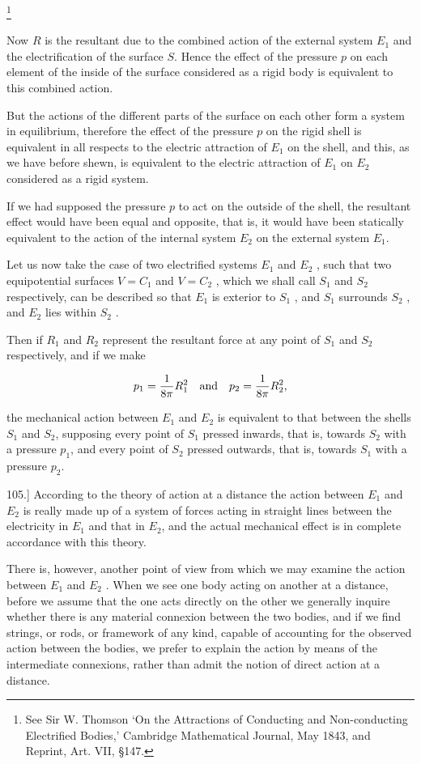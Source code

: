 \documentclass[11pt,a4paper]{article}
\begin{document}
\footnote[1]{See Sir W. Thomson `On the Attractions of Conducting and Non-conducting Electrified Bodies,' Cambridge Mathematical Journal, May 1843, and Reprint, Art. VII, \S 147.}

Now $R$ is the resultant due to the combined action of the external system $E_1$ and the electrification of the surface $S$. Hence the effect of the pressure $p$ on each element of the inside of the surface considered as a rigid body is equivalent to this combined action.

But the actions of the different parts of the surface on each other form a system in equilibrium, therefore the effect of the pressure $p$ on the rigid shell is equivalent in all respects to the electric attraction of $E_1$ on the shell, and this, as we have before shewn, is equivalent to the electric attraction of $E_1$ on $E_2$ considered as a rigid system.

If we had supposed the pressure $p$ to act on the outside of the shell, the resultant effect would have been equal and opposite, that is, it would have been statically equivalent to the action of the internal system $E_2$ on the external system $E_1$.

Let us now take the case of two electrified systems  $E_1$  and  $E_2$ , such that two equipotential surfaces  $V = C_1$  and  $V = C_2$ , which we shall call  $S_1$  and  $S_2$  respectively, can be described so that  $E_1$  is exterior to  $S_1$ , and  $S_1$  surrounds  $S_2$ , and  $E_2$  lies within  $S_2$ .

Then if $R_1$ and $R_2$ represent the resultant force at any point of $S_1$ and $S_2$ respectively, and if we make

\[
p_1=\frac{1}{8\pi}R_1^2\quad\hbox{and}\quad p_2=\frac{1}{8\pi}R_2^2,
\]

the mechanical action between $E_1$ and $E_2$ is equivalent to that between the shells $S_1$ and $S_2$, supposing every point of $S_1$ pressed inwards, that is, towards $S_2$ with a pressure $p_1$, and every point of $S_2$ pressed outwards, that is, towards $S_1$ with a pressure $p_2$.

105.] According to the theory of action at a distance the action between $E_1$ and $E_2$ is really made up of a system of forces acting in straight lines between the electricity in $E_1$ and that in $E_2$, and the actual mechanical effect is in complete accordance with this theory.

There is, however, another point of view from which we may examine the action between  $E_1$  and  $E_2$ . When we see one body acting on another at a distance, before we assume that the one acts directly on the other we generally inquire whether there is any material connexion between the two bodies, and if we find strings, or rods, or framework of any kind, capable of accounting for the observed action between the bodies, we prefer to explain the action by means of the intermediate connexions, rather than admit the notion of direct action at a distance.
\end{document}
